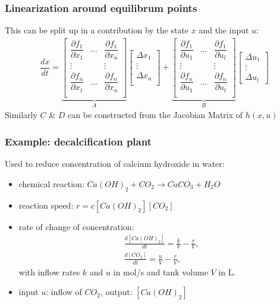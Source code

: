\begin{frame}
	\frametitle{Linearization around equilibrum points}
	This can be split up in a contribution by the state $x$ and the input $u$:
	\begin{align*}
		\dfrac{dx}{dt} =
		\underbrace{\begin{bmatrix}
						\dfrac{\partial f_1}{\partial x_1} 	&\dots 	&\dfrac{\partial f_1}{\partial x_n} 	\\
						\vdots 								&		&\vdots  								\\
						\dfrac{\partial f_n}{\partial x_1} 	&\dots 	&\dfrac{\partial f_n}{\partial x_n} 	\\
					\end{bmatrix}}_A
		\begin{bmatrix}
			\Delta x_1 \\
			\vdots \\
			\Delta x_n \\
		\end{bmatrix}
		+
		\underbrace{	\begin{bmatrix}
							\dfrac{\partial f_1}{\partial u_1} 	&\dots 	&\dfrac{\partial f_1}{\partial u_l} 	\\
							\vdots 								&		&\vdots 								\\ 
							\dfrac{\partial f_n}{\partial u_1}	&\dots 	&\dfrac{\partial f_n}{\partial u_l}		\\
						\end{bmatrix}}_B
		\begin{bmatrix}
			\Delta u_1 \\
			\vdots \\
			\Delta u_l 
		\end{bmatrix}
	\end{align*}
	Similarly $C$ \& $D$ can be constructed from the Jacobian Matrix of $h(x,u)$
\end{frame}
	


\begin{frame}
	\frametitle{Example: decalcification plant}
	Used to reduce concentration of calcium hydroxide in water:
	\begin{itemize}
		\item chemical reaction: $Ca(OH)_2 + CO_2 \rightarrow CaCO_3 + H_2O$
		\item reaction speed: $r = c[Ca(OH)_2][CO_2]$
		\item rate of change of concentration:
		\begin{align*}
		\frac{d[Ca(OH)_2]}{dt} = \frac{k}{V} - \frac{r}{V}, \\
		\frac{d[CO_2]}{dt} = \frac{u}{V} - \frac{r}{V}, 
		\end{align*}
		with inflow rates $k$ and $u$ in mol/s and tank volume $V$ in L.
		\item input $u$: inflow of $CO_2$, output: $[Ca(OH)_2]$
	\end{itemize}
\end{frame}

